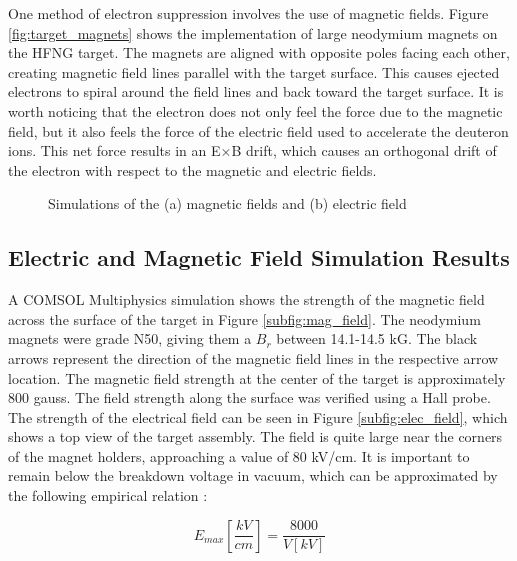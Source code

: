 \documentclass[aps,prstab,twocolumn,superscriptaddress]{revtex4-1}
\begin{document}
One method of electron suppression involves the use of magnetic fields.  Figure \ref{fig:target_magnets} shows the implementation of large neodymium magnets on the HFNG target. The magnets are aligned with opposite poles facing each other, creating magnetic field lines parallel with the target surface. This causes ejected electrons to spiral around the field lines and back toward the target surface. It is worth noticing that the electron does not only feel the force due to the magnetic field, but it also feels the force of the electric field used to accelerate the deuteron ions. This net force results in an E$\times$B drift, which causes an orthogonal drift of the electron with respect to the magnetic and electric fields. 

\begin{figure}
	\centering
	\hfill
	\caption{Simulations of the (a) magnetic fields and (b) electric field}
	\label{fig:mag_and_elec_fields}
\end{figure}

\subsection{Electric and Magnetic Field Simulation Results}

A COMSOL Multiphysics\textsuperscript{\textregistered} simulation shows the strength of the magnetic field across the surface of the target in Figure \ref{subfig:mag_field}. The neodymium magnets were grade N50, giving them a $B_{r}$ between 14.1-14.5 kG. The black arrows represent the direction of the magnetic field lines in the respective arrow location. The magnetic field strength at the center of the target is approximately 800 gauss. The field strength along the surface was verified using a Hall probe. The strength of the electrical field can be seen in Figure \ref{subfig:elec_field}, which shows a top view of the target assembly. The field is quite large near the corners of the magnet holders, approaching a value of 80 kV/cm. It is important to remain below the breakdown voltage in vacuum, which can be approximated by the following empirical relation \cite{HV_Breakdown}:

\begin{equation}
E_{max}\left[\frac{kV}{cm}\right] = \frac{8000}{V\left[kV\right]}
\end{equation}
\end{document}
